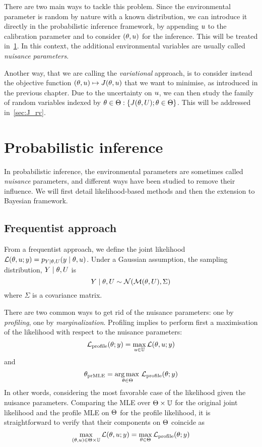 \documentclass[../../Main_ManuscritThese.tex]{subfiles}
\begin{document}
There are two main ways to tackle this problem. Since the
environmental parameter is random by nature with a known distribution,
we can introduce it directly in the probabilistic inference framework,
by appending $u$ to the calibration parameter and to consider
$(\theta, u)$ for the inference. This will be
treated in~\cref{sec:nuisance_parameters}. In this context, the
additional environmental variables are usually called \emph{nuisance
  parameters}.

Another way, that we are calling the \emph{variational} approach, is
to consider instead the objective function
$(\theta, u) \mapsto J(\theta, u)$ that we want to minimise, as
introduced in the previous chapter. Due to the uncertainty on $u$,
we can then study the family of random variables indexed by
$\theta \in \Theta: \{J(\theta, U); \theta\in\Theta\}$. This will be
addressed in~\cref{sec:J_rv}.

\section{Probabilistic inference}
\label{sec:nuisance_parameters}
In probabilistic inference, the environmental parameters are sometimes
called \emph{nuisance} parameters, and different ways have been
studied to remove their influence.  We will first detail
likelihood-based methods and then the extension to Bayesian framework.
\subsection{Frequentist approach}
From a frequentist approach, we define the joint likelihood
$\mathcal{L}(\theta, u ;y) = p_{Y\mid \theta,U}(y \mid \theta, u)$.
Under a Gaussian assumption, the sampling distribution,
$Y\mid \theta, U$ is
\begin{equation}
Y \mid \theta, U \sim \mathcal{N}(\mathcal{M}(\theta, U), \Sigma)
\end{equation}
where $\Sigma$ is a covariance matrix.

There are two common ways to get rid of the nuisance parameters: one
by \emph{profiling}, one by \emph{marginalization}.  Profiling implies
to perform first a maximisation of the likelihood with respect to the
nuisance parameters:
\begin{equation}
  \label{eq:def_profile_lik}
  \mathcal{L}_{\mathrm{profile}}(\theta;y) = \max_{u \in \mathbb{U}} \mathcal{L}(\theta,u;y)
\end{equation}
and
\begin{equation}
  {\theta}_{\mathrm{prMLE}} = \operatorname*{arg\,max \,}_{\theta\in\Theta} \mathcal{L}_{\mathrm{profile}}(\theta;y)
\end{equation}
In other words, considering the most favorable case of the likelihood
given the nuisance parameters.  Comparing the MLE over
$\Theta \times \mathbb{U}$ for the original joint likelihood and the
profile MLE on $\Theta$ for the profile likelihood, it is
straightforward to verify that their components on $\Theta$ coincide
as
\begin{equation}
  \max_{(\theta ,u) \in \Theta\times \mathbb{U}} \mathcal{L}(\theta,u;y) = \max_{\theta\in \Theta} \mathcal{L}_{\mathrm{profile}}(\theta;y)
\end{equation}
\end{document}
